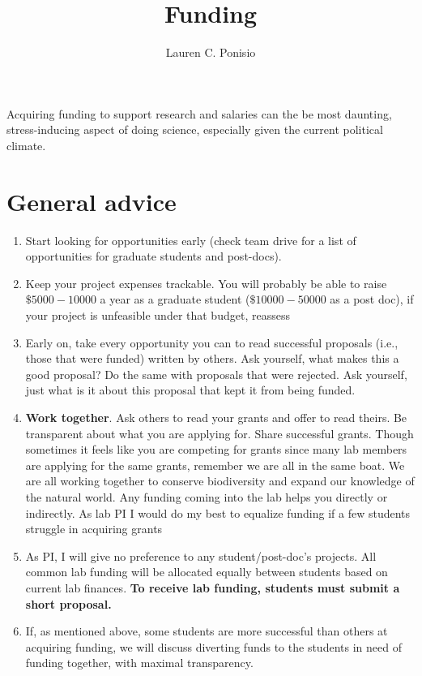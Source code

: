\documentclass[12pt]{article}
\title{Funding}
\author{Lauren C. Ponisio}
\begin{document}
\maketitle

Acquiring funding to support research and salaries can the be most
daunting, stress-inducing aspect of doing science, especially given
the current political climate.

\section{General advice}

\begin{enumerate}
\item Start looking for opportunities early (check team drive for a
  list of opportunities for graduate students and post-docs).
\item Keep your project expenses trackable. You will probably be able
  to raise $\$5000-10000$ a year as a graduate student
  ($\$10000-50000$ as a post doc), if your project is unfeasible under
  that budget, reassess
\item Early on, take every opportunity you can to read successful
  proposals (i.e., those that were funded) written by others. Ask
  yourself, what makes this a good proposal? Do the same with
  proposals that were rejected. Ask yourself, just what is it about
  this proposal that kept it from being funded. 
\item \textbf{Work together}. Ask others to read your grants and offer
  to read theirs. Be transparent about what you are applying
  for. Share successful grants. Though sometimes it feels like you are
  competing for grants since many lab members are applying for the
  same grants, remember we are all in the same boat. We are all
  working together to conserve biodiversity and expand our knowledge
  of the natural world. Any funding coming into the lab helps you
  directly or indirectly. As lab PI I would do my best to equalize
  funding if a few students struggle in acquiring grants
\item As PI, I will give no preference to any student/post-doc's
  projects. All common lab funding will be allocated equally between
  students based on current lab finances. \textbf{To receive lab
    funding, students must submit a short proposal.}
\item If, as mentioned above, some students are more successful than
  others at acquiring funding, we will discuss diverting funds to the
  students in need of funding together, with maximal transparency.
\end{enumerate}
\end{document}
